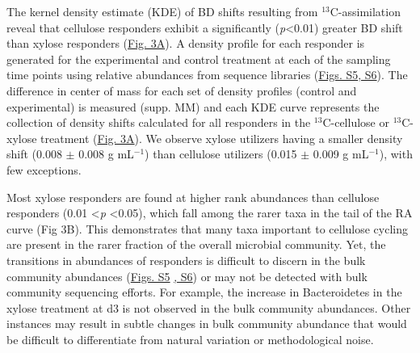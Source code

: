 The kernel density estimate (KDE) of BD shifts resulting from
$^{13}$C-assimilation reveal that cellulose responders exhibit a significantly
(\textit{p}\textless 0.01) greater BD shift than xylose responders
(\href{https://authorea.com/users/3537/articles/3612/master/file/figures/shift_and_rabund2/shift_and_rabund2.png}{Fig.
3A}). A density profile for each responder is generated for the experimental
and control treatment at each of the sampling time points using relative
abundances from sequence libraries
(\href{https://authorea.com/users/3537/articles/8459/master/file/figures/xylose_resp_profiles/xylose_resp_profiles.png}{Figs.
S5}\href{https://authorea.com/users/3537/articles/8459/master/file/figures/cellulose_resp_profiles/cellulose_resp_profiles.png}{,
S6}). The difference in center of mass for each set of density profiles
(control and experimental) is measured (supp. MM) and each KDE curve represents
the collection of density shifts calculated for all responders in the
$^{13}$C-cellulose or $^{13}$C-xylose treatment
(\href{https://authorea.com/users/3537/articles/3612/master/file/figures/shift_and_rabund2/shift_and_rabund2.png}{Fig.
3A}). We observe xylose utilizers having a smaller density shift (0.008 $\pm$
0.008 g mL$^{-1}$) than cellulose utilizers (0.015 $\pm$ 0.009 g mL$^{-1}$),
with few exceptions. 

Most xylose responders are found at higher rank abundances than cellulose
responders (0.01 \textless \textit{p} \textless 0.05), which fall among the
rarer taxa in the tail of the RA curve (Fig 3B). This demonstrates that many
taxa important to cellulose cycling are present in the rarer fraction of the
overall microbial community. Yet, the transitions in abundances of responders
is difficult to discern in the bulk community abundances
(\href{https://authorea.com/users/3537/articles/8459/master/file/figures/xylose_resp_profiles/xylose_resp_profiles.png}{Figs.
S5}
\href{https://authorea.com/users/3537/articles/8459/master/file/figures/cellulose_resp_profiles/cellulose_resp_profiles.png}{,
S6}) or may not be detected with bulk community sequencing efforts. For
example, the increase in Bacteroidetes in the xylose treatment at d3 is not
observed in the bulk community abundances. Other instances may result in subtle
changes in bulk community abundance that would be difficult to differentiate
from natural variation or methodological noise.


